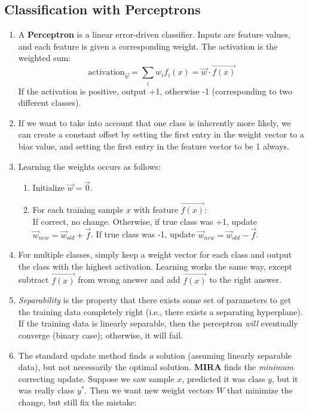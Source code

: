 \documentclass[10pt]{article}
\begin{document}
\begin{multicols}{2}
\begin{enumerate}
    \subsection{Classification with Perceptrons}
    \begin{enumerate}
        \item A \textbf{Perceptron} is a linear error-driven classifier. Inputs are feature values, and each feature is given a corresponding weight. The activation is the weighted sum: $$\text{activation}_{\vec{w}}=\sum_{i}w_if_i(x)=\vec{w} \cdot \vec{f(x)}$$ 
        If the activation is positive, output +1, otherwise -1 (corresponding to two different classes).
        \item If we want to take into account that one class is inherently more likely, we can create a constant offset by setting the first entry in the weight vector to a bias value, and setting the first entry in the feature vector to be 1 always.
        \item Learning the weights occurs as follows:
        \begin{enumerate}
            \item Initialize $\vec{w}=\vec{0}$.
            \item For each training sample $x$ with feature $\vec{f(x)}$: \\ If correct, no change. Otherwise, if true class was +1, update $\vec{w}_{new} = \vec{w}_{old}+\vec{f}$. If true class was -1, update $\vec{w}_{new} = \vec{w}_{old}-\vec{f}$.
        \end{enumerate}
        \item For multiple classes, simply keep a weight vector for each class and output the class with the highest activation. Learning works the same way, except subtract $\vec{f(x)}$ from wrong answer and add $\vec{f(x)}$ to the right answer. 
        \item \textit{Separability} is the property that there exists some set of parameters to get the training data completely right (i.e., there exists a separating hyperplane). If the training data is linearly separable, then the perceptron \textit{will} eventually converge (binary case); otherwise, it will fail.
        \item The standard update method finds \textit{a} solution (assuming linearly separable data), but not necessarily the optimal solution. \textbf{MIRA} finds the \textit{minimum} correcting update. Suppose we saw sample $x$, predicted it was class $y$, but it was really class $y^*$. Then we want new weight vectors $W$ that minimize the change, but still fix the mistake: 

\end{enumerate}
\end{enumerate}
\end{multicols}
\end{document}
